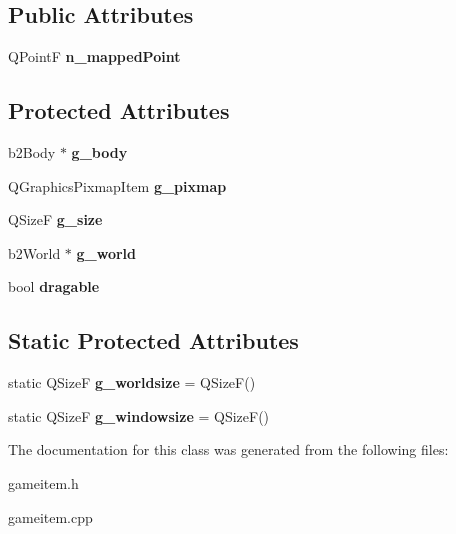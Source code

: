 \subsection*{Public Attributes}
\begin{DoxyCompactItemize}
\item 
\hypertarget{classGameItem_a3ee0fcf85f92718f1baaa3b76419c2fb}{Q\-Point\-F {\bfseries n\-\_\-mapped\-Point}}\label{classGameItem_a3ee0fcf85f92718f1baaa3b76419c2fb}

\end{DoxyCompactItemize}
\subsection*{Protected Attributes}
\begin{DoxyCompactItemize}
\item 
\hypertarget{classGameItem_aa021d911802e721b49270fe790d5e605}{b2\-Body $\ast$ {\bfseries g\-\_\-body}}\label{classGameItem_aa021d911802e721b49270fe790d5e605}

\item 
\hypertarget{classGameItem_ae01ffe4691dbeef8e2b89949061688ae}{Q\-Graphics\-Pixmap\-Item {\bfseries g\-\_\-pixmap}}\label{classGameItem_ae01ffe4691dbeef8e2b89949061688ae}

\item 
\hypertarget{classGameItem_a7d359356b75422daf7589718358a53f0}{Q\-Size\-F {\bfseries g\-\_\-size}}\label{classGameItem_a7d359356b75422daf7589718358a53f0}

\item 
\hypertarget{classGameItem_a4eea6373f6df167a191100826fa0c151}{b2\-World $\ast$ {\bfseries g\-\_\-world}}\label{classGameItem_a4eea6373f6df167a191100826fa0c151}

\item 
\hypertarget{classGameItem_a3794162e832b8b7779a3dd5a61e62d9d}{bool {\bfseries dragable}}\label{classGameItem_a3794162e832b8b7779a3dd5a61e62d9d}

\end{DoxyCompactItemize}
\subsection*{Static Protected Attributes}
\begin{DoxyCompactItemize}
\item 
\hypertarget{classGameItem_afc553cb4c7c10569dd0fc54e49173e95}{static Q\-Size\-F {\bfseries g\-\_\-worldsize} = Q\-Size\-F()}\label{classGameItem_afc553cb4c7c10569dd0fc54e49173e95}

\item 
\hypertarget{classGameItem_a32623c6e1c31a1a3976bb717c1782a86}{static Q\-Size\-F {\bfseries g\-\_\-windowsize} = Q\-Size\-F()}\label{classGameItem_a32623c6e1c31a1a3976bb717c1782a86}

\end{DoxyCompactItemize}


The documentation for this class was generated from the following files\-:\begin{DoxyCompactItemize}
\item 
gameitem.\-h\item 
gameitem.\-cpp\end{DoxyCompactItemize}
